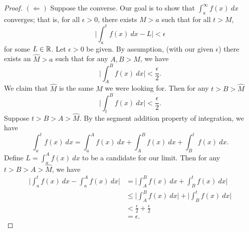 \documentclass[a4paper]{article}
\begin{document}
\begin{proof}
\( (\Longleftarrow) \)
Suppose the converse. Our goal is to show that \( \int_{ a }^{ \infty  } f(x) \ dx  \) converges; that is, for all \( \epsilon > 0  \), there exists \( M > a  \) such that for all \( t > M  \), 
\[  \Big| \int_{ a }^{ t } f(x) \ dx - L  \Big|  < \epsilon \]
for some \( L \in \mathbb{R}  \). Let \( \epsilon > 0  \) be given. By assumption, (with our given \( \epsilon  \)) there exists an \( \hat{M} > a  \) such that for any \( A,B > M  \), we have
\[  \Big| \int_{ A }^{ B }  f(x) \ dx   \Big| < \frac{ \epsilon }{ 2 }. \tag{1} \]
We claim that \( \hat{M} \) is the same \(  M \) we were looking for. Then for any \( t > B >  \hat{M} \)
\[  \Big| \int_{ t }^{ B  }  f(x) \ dx   \Big|  < \frac{ \epsilon }{ 2 }. \tag{2} \]
Suppose \( t > B > A > \hat{M} \). By the segment addition property of integration, we have 
\[  \int_{ a }^{ t }  f(x) \ dx = \int_{ a  }^{  A  }  f(x)  \ dx + \int_{ A }^{ B }  f(x) \ dx + \int_{ B }^{ t  }  f(x) \ dx.  \]
Define \( L = \int_{ a }^{  A  }  f(x) \ dx   \) to be a candidate for our limit. Then for any \( t > B > A > \hat{M} \), we have 
\begin{align*}
    \Big| \int_{ a }^{ t }  f(x) \ dx - \int_{ a }^{ A  }  f(x) \ dx  \Big| &= \Big| \int_{ A }^{ B }  f(x) \ dx + \int_{ B }^{ t  } f(x) \ dx \Big|  \\
                                                                            &\leq \Big| \int_{ A }^{ B }  f(x) \ dx  \Big|  + \Big| \int_{ B }^{ t } f(x) \ dx  \Big| \\
                                                                            &< \frac{ \epsilon }{ 2 }  + \frac{ \epsilon }{ 2 } \\
                                                                            &=  \epsilon.
\end{align*}
\end{proof}
\end{document}

